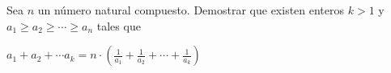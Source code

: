 \begin{problem}
	Sea $n$ un número natural compuesto. Demostrar que existen enteros $k>1$ y $a_1 \geq a_2 \geq \cdots \geq a_n$ tales que
	\begin{center}
		$\displaystyle{a_1 + a_2 + \cdots a_k = n \cdot \left(\frac{1}{a_1} + \frac{1}{a_2} + \cdots + \frac{1}{a_k}\right)}$ 
	\end{center}
\end{problem}